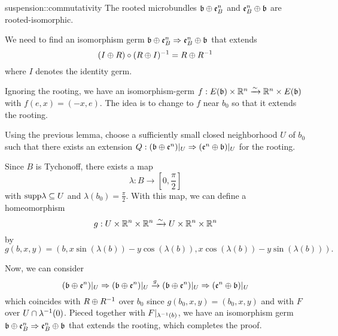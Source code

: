\begin{mylemma}{suspension::commutativity}
    The rooted microbundles $\mathfrak{b} \oplus{} \mathfrak{e}^{n}_B$ and $\mathfrak{e}^{n}_B \oplus{} \mathfrak{b}$ are rooted-isomorphic. 
\end{mylemma}

\begin{myproof}
    We need to find an isomorphism germ
    $\mathfrak{b} \oplus{} \mathfrak{e}^{n}_B \Rightarrow{} \mathfrak{e}^{n}_B \oplus{} \mathfrak{b}$ that extends
    \[ (I \oplus{} R) \circ (R \oplus{} I)^{-1} = R \oplus{} R^{-1} \]
    where $I$ denotes the identity germ.

    Ignoring the rooting, we have an
    isomorphism-germ $f: E(\mathfrak{b}) \times \mathbb{R}^n \xrightarrow{\sim} \mathbb{R}^n \times E(\mathfrak{b})$ with $f(e, x) = (-x, e)$.
    The idea is to change to $f$ near $b_0$ so that it extends the rooting.

    Using the previous lemma, choose a sufficiently small closed neighborhood $U$ of $b_0$
    such that there exists an extension $Q: (\mathfrak{b} \oplus{} \mathfrak{e}^{n})\vert_{U} \Rightarrow{} (\mathfrak{e}^{n} \oplus{} \mathfrak{b})\vert_{U}$ for the rooting.

    Since $B$ is Tychonoff, there exists a map
    \[ \lambda: B \to [0, \frac{\pi}{2}] \]
    with $\text{supp} \lambda \subseteq{} U$ and $\lambda(b_0) = \frac{\pi}{2}$.
    With this map, we can define a homeomorphism
    \[ g: U \times \mathbb{R}^n \times \mathbb{R}^n \xrightarrow{\sim} U \times \mathbb{R}^n \times \mathbb{R}^n \]
    by
    \[ g(b, x, y) = (b, x \sin(\lambda(b)) - y \cos(\lambda(b)), x \cos(\lambda(b)) - y \sin(\lambda(b))). \]

    Now, we can consider
    \[ (\mathfrak{b} \oplus{} \mathfrak{e}^{n})\vert_{U} \Rightarrow{} (\mathfrak{b} \oplus{} \mathfrak{e}^{n})\vert_{U} \xrightarrow{g} (\mathfrak{b} \oplus{} \mathfrak{e}^{n})\vert_{U} \Rightarrow{} (\mathfrak{e}^{n} \oplus{} \mathfrak{b})\vert_{U} \]
    which coincides with $R \oplus{} R^{-1}$ over $b_0$
    since $g(b_0, x, y) = (b_0, x, y)$ and with $F$ over $U \cap \lambda^{-1}(0)$.
    Pieced together with $F\vert_{\lambda^{-1}(b)}$,
    we have an isomorphism germ $\mathfrak{b} \oplus{} \mathfrak{e}^{n}_B \Rightarrow{} \mathfrak{e}^{n}_B \oplus{} \mathfrak{b}$
    that extends the rooting, which completes the proof.
\end{myproof}